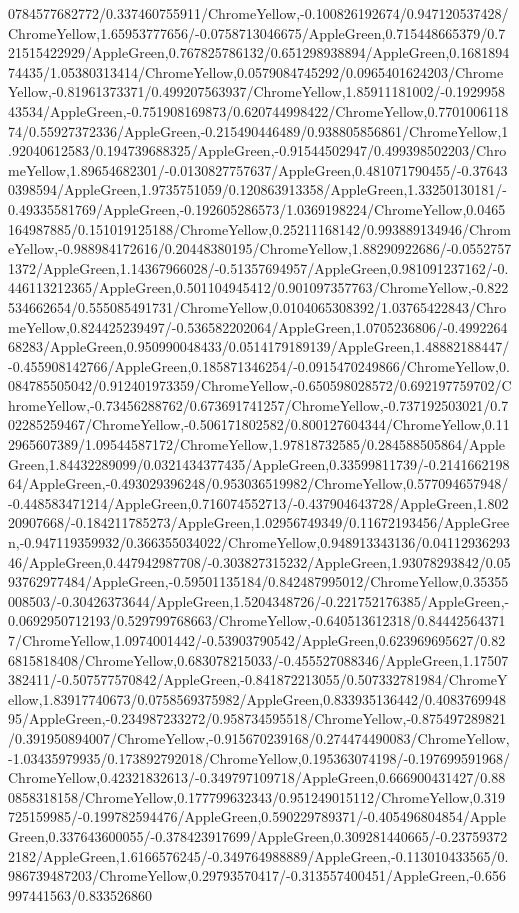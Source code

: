 {\begin{tikzternal}
0784577682772/0.337460755911/ChromeYellow,-0.100826192674/0.947120537428/ChromeYellow,1.65953777656/-0.0758713046675/AppleGreen,0.715448665379/0.721515422929/AppleGreen,0.767825786132/0.651298938894/AppleGreen,0.168189474435/1.05380313414/ChromeYellow,0.0579084745292/0.0965401624203/ChromeYellow,-0.81961373371/0.499207563937/ChromeYellow,1.85911181002/-0.192995843534/AppleGreen,-0.751908169873/0.620744998422/ChromeYellow,0.770100611874/0.55927372336/AppleGreen,-0.215490446489/0.938805856861/ChromeYellow,1.92040612583/0.194739688325/AppleGreen,-0.91544502947/0.499398502203/ChromeYellow,1.89654682301/-0.0130827757637/AppleGreen,0.481071790455/-0.376430398594/AppleGreen,1.9735751059/0.120863913358/AppleGreen,1.33250130181/-0.49335581769/AppleGreen,-0.192605286573/1.0369198224/ChromeYellow,0.0465164987885/0.151019125188/ChromeYellow,0.25211168142/0.993889134946/ChromeYellow,-0.988984172616/0.20448380195/ChromeYellow,1.88290922686/-0.05527571372/AppleGreen,1.14367966028/-0.51357694957/AppleGreen,0.981091237162/-0.446113212365/AppleGreen,0.501104945412/0.901097357763/ChromeYellow,-0.822534662654/0.555085491731/ChromeYellow,0.0104065308392/1.03765422843/ChromeYellow,0.824425239497/-0.536582202064/AppleGreen,1.0705236806/-0.499226468283/AppleGreen,0.950990048433/0.0514179189139/AppleGreen,1.48882188447/-0.455908142766/AppleGreen,0.185871346254/-0.0915470249866/ChromeYellow,0.084785505042/0.912401973359/ChromeYellow,-0.650598028572/0.692197759702/ChromeYellow,-0.73456288762/0.673691741257/ChromeYellow,-0.737192503021/0.702285259467/ChromeYellow,-0.506171802582/0.800127604344/ChromeYellow,0.112965607389/1.09544587172/ChromeYellow,1.97818732585/0.284588505864/AppleGreen,1.84432289099/0.0321434377435/AppleGreen,0.33599811739/-0.214166219864/AppleGreen,-0.493029396248/0.953036519982/ChromeYellow,0.577094657948/-0.448583471214/AppleGreen,0.716074552713/-0.437904643728/AppleGreen,1.80220907668/-0.184211785273/AppleGreen,1.02956749349/0.11672193456/AppleGreen,-0.947119359932/0.366355034022/ChromeYellow,0.948913343136/0.0411293629346/AppleGreen,0.447942987708/-0.303827315232/AppleGreen,1.93078293842/0.0593762977484/AppleGreen,-0.59501135184/0.842487995012/ChromeYellow,0.35355008503/-0.30426373644/AppleGreen,1.5204348726/-0.221752176385/AppleGreen,-0.0692950712193/0.529799768663/ChromeYellow,-0.640513612318/0.844425643717/ChromeYellow,1.0974001442/-0.53903790542/AppleGreen,0.623969695627/0.826815818408/ChromeYellow,0.683078215033/-0.455527088346/AppleGreen,1.17507382411/-0.507577570842/AppleGreen,-0.841872213055/0.507332781984/ChromeYellow,1.83917740673/0.0758569375982/AppleGreen,0.833935136442/0.408376994895/AppleGreen,-0.234987233272/0.958734595518/ChromeYellow,-0.875497289821/0.391950894007/ChromeYellow,-0.915670239168/0.274474490083/ChromeYellow,-1.03435979935/0.173892792018/ChromeYellow,0.195363074198/-0.197699591968/ChromeYellow,0.42321832613/-0.349797109718/AppleGreen,0.666900431427/0.880858318158/ChromeYellow,0.177799632343/0.951249015112/ChromeYellow,0.319725159985/-0.199782594476/AppleGreen,0.590229789371/-0.405496804854/AppleGreen,0.337643600055/-0.378423917699/AppleGreen,0.309281440665/-0.237593722182/AppleGreen,1.6166576245/-0.349764988889/AppleGreen,-0.113010433565/0.986739487203/ChromeYellow,0.29793570417/-0.313557400451/AppleGreen,-0.656997441563/0.833526860
\end{tikzternal}}
